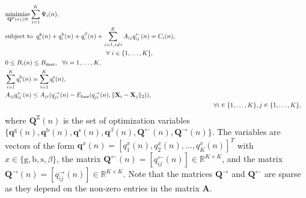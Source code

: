 \documentclass[10pt, letter,twocolumn]{IEEEtran}
\begin{document}
\vspace{-0.0in}
\small
\begin{align}
& \underset{ \mathbf{Q}^{\text{Z}}(n)\geq 0}{\text{minimize}}
  \sum \limits_{i=1}^{K} \Psi_{i}(n), \label{Obj1}\\
& \text{subject to} \hspace{0.2cm}
  q_{i}^{\text{g}}(n) + q_{i}^{\text{b}}(n) + q_{i}^{\beta}(n) + \sum \limits^{K}_{j=1, j\neq i} A_{ij} q^{\leftarrow}_{ij}(n) = C_{i}(n), \notag \\
& \hspace{5.5cm}\ \forall \ i \in \{1, \ldots,K \}, \label{const1}\\
& 0 \leq B_{i}(n) \leq B_{\max}, \ \ \forall i = 1,\ldots,K, \label{const2}\\
& \sum \limits_{i=1}^{K} q_{i}^{\text{b}}(n) = \sum \limits_{i=1}^{K} q_{i}^{\text{s}}(n),\label{const3} \\
& A_{ij}q^{\leftarrow}_{ij}(n) \leq  A_{ji}(q^{\rightarrow}_{ji}(n) -  E_{\text{loss}}(q^{\rightarrow}_{ji}(n), \|\mathbf{X}_{i} - \mathbf{X}_{j}\|_{2}) ), \notag \\
 &&& \hspace{1.8cm}\forall i \in \{1, \ldots,K\},j \in \{1, \ldots,K\}, \label{const4}
\end{align}\normalsize
where $\mathbf{Q}^{\text{Z}}(n)$ is the set of optimization variables $\{\mathbf{q}^{\text{g}}(n), \mathbf{q}^{\text{b}}(n), \mathbf{q}^{\text{s}}(n), \mathbf{q}^{\beta}(n), \mathbf{Q}^{\leftarrow}(n), \mathbf{Q}^{\rightarrow}(n)  \}$. The variables are vectors of the form $\mathbf{q}^{x}(n) = [q_{1}^{x}(n), q_{2}^{x}(n), \ldots, q_{K}^{x}(n) ]^{T}$ with $x\in\{\text{g}, \text{b}, \text{s}, \beta\}$, the matrix $\mathbf{Q}^{\leftarrow}(n) = [ q^{\leftarrow}_{ij}(n)] \in \mathbb{R}^{K \times K}$, and the matrix $\mathbf{Q}^{\rightarrow}(n) = [ q^{\rightarrow}_{ij}(n)] \in \mathbb{R}^{K \times K}$. Note that the matrices $\mathbf{Q}^{\rightarrow}$ and $\mathbf{Q}^{\leftarrow}$ are sparse as they depend on the non-zero entries in the matrix $\textbf{A}$.
\end{document}
